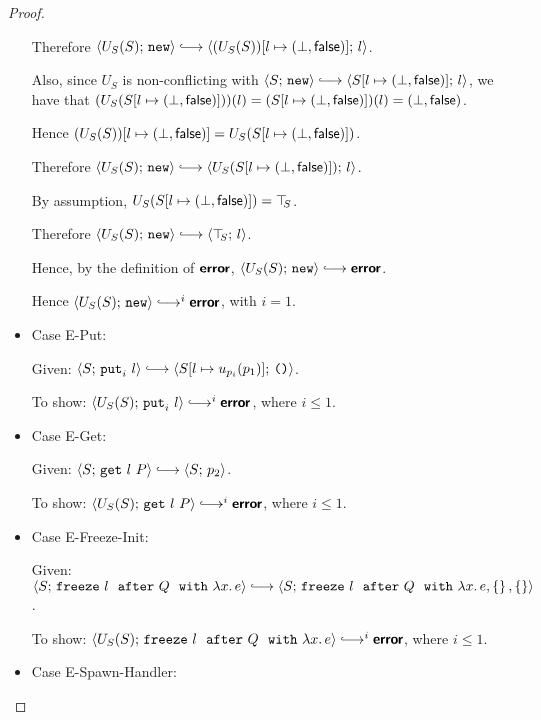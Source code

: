 \begin{proof}
\begin{itemize}
    Therefore $\config{U_S(S)}{\NEW} \parstepsto
    \config{\extS{(U_S(S))}{l}{\bot}{\frozenfalse}}{l}$.

    Also, since $U_S$ is non-conflicting with $\config{S}{\NEW}
    \parstepsto \config{\extS{S}{l}{\bot}{\frozenfalse}}{l}$, we
    have that $(U_S(S[l \mapsto (\bot, \textsf{false})]))(l) =
    (S[l \mapsto (\bot, \textsf{false})])(l) =
    (\bot, \textsf{false})$.

    Hence $(U_S(S))[l \mapsto (\bot, \textsf{false})] =
    U_S(S[l \mapsto (\bot, \textsf{false})])$.

    Therefore $\config{U_S(S)}{\NEW} \parstepsto
    \config{U_S(\extS{S}{l}{\bot}{\frozenfalse})}{l}$.

    By assumption, $U_S(S[l \mapsto (\bot, \textsf{false})]) = \top\hspace{-0.85mm}_{S}$.

    Therefore $\config{U_S(S)}{\NEW} \parstepsto \config{\topS}{l}$.

    Hence, by the definition of $\textbf{\textsf{error}}$, $\config{U_S(S)}{\NEW}
    \parstepsto \error$.

    Hence $\config{U_S(S)}{\NEW} \parstepsto^i \error$, with $i = 1$.

  \item Case {\sc E-Put}:

    Given: $\config{S}{\putiexp{l}} \parstepsto
    \config{\extSRaw{S}{l}{u_{p_i}(p_1)}}{\unit}$.

    To show: $\config{U_S(S)}{\putiexp{l}} \parstepsto^i \error$,
    where $i \leq 1$.


  \item Case {\sc E-Get}:

    Given: $\config{S}{\getexp{l}{P}} \parstepsto \config{S}{p_2}$.

    To show: $\config{U_S(S)}{\getexp{l}{P}} \parstepsto^i \error$,
    where $i \leq 1$.


  \item Case {\sc E-Freeze-Init}:

    Given: $\config{S}{\freezeafter{l}{Q}{\lam{x}{e}}} \parstepsto
    \config{S}{\freezeafterfull{l}{Q}{\lam{x}{e}}{\setof{}}{\setof{}}}$.

    To show: $\config{U_S(S)}{\freezeafter{l}{Q}{\lam{x}{e}}}
    \parstepsto^i \error$, where $i \leq 1$.


  \item Case {\sc E-Spawn-Handler}:


\end{itemize}
\end{proof}
